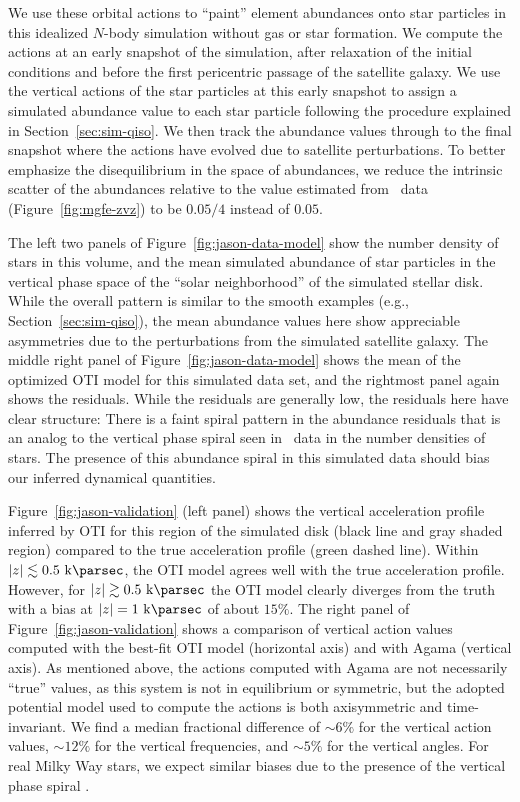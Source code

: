\documentclass[modern]{aastex631}
\begin{document}
We use these orbital actions to ``paint'' element abundances onto star particles in
this idealized $N$-body simulation without gas or star formation.
We compute the actions at an early snapshot of the simulation, after relaxation of the
initial conditions and before the first pericentric passage of the satellite galaxy.
We use the vertical actions of the star particles at this early snapshot to assign a
simulated  abundance value to each star particle following the procedure
explained in Section~\ref{sec:sim-qiso}.
We then track the abundance values through to the final snapshot where the actions have
evolved due to satellite perturbations.
To better emphasize the disequilibrium in the space of abundances, we reduce the
intrinsic scatter of the abundances relative to the value estimated from \apogee\ data
(Figure~\ref{fig:mgfe-zvz}) to be $0.05 / 4$ instead of $0.05$.

The left two panels of Figure~\ref{fig:jason-data-model} show the number density of
stars in this volume, and the mean simulated  abundance of star particles
in the vertical phase space of the ``solar neighborhood'' of the simulated stellar disk.
While the overall pattern is similar to the smooth examples (e.g.,
Section~\ref{sec:sim-qiso}), the mean abundance values here show appreciable asymmetries
due to the perturbations from the simulated satellite galaxy.
The middle right panel of Figure~\ref{fig:jason-data-model} shows the mean 
of the optimized OTI model for this simulated data set, and the rightmost panel again
shows the residuals.
While the residuals are generally low, the residuals here have clear structure: There is
a faint spiral pattern in the abundance residuals that is an analog to the vertical
phase spiral seen in \gaia\ data in the number densities of stars.
The presence of this abundance spiral in this simulated data should bias our inferred
dynamical quantities.

Figure~\ref{fig:jason-validation} (left panel) shows the vertical acceleration profile
inferred by OTI for this region of the simulated disk (black line and gray shaded
region) compared to the true acceleration profile (green dashed line).
Within $|z| \lesssim 0.5~\kpc$, the OTI model agrees well with the true acceleration
profile.
However, for $|z| \gtrsim 0.5~\kpc$ the OTI model clearly diverges from the truth with a
bias at $|z| = 1~\kpc$ of about $15\%$.
The right panel of Figure~\ref{fig:jason-validation} shows a comparison of vertical
action values computed with the best-fit OTI model (horizontal axis) and with Agama
(vertical axis).
As mentioned above, the actions computed with Agama are not necessarily ``true'' values,
as this system is not in equilibrium or symmetric, but the adopted potential model used
to compute the actions is both axisymmetric and time-invariant.
We find a median fractional difference of $\sim 6\%$ for the vertical action values,
$\sim 12\%$ for the vertical frequencies, and $\sim 5\%$ for the vertical angles.
For real Milky Way stars, we expect similar biases due to the presence of the vertical
phase spiral \citep{Antoja:2018}.
\end{document}
